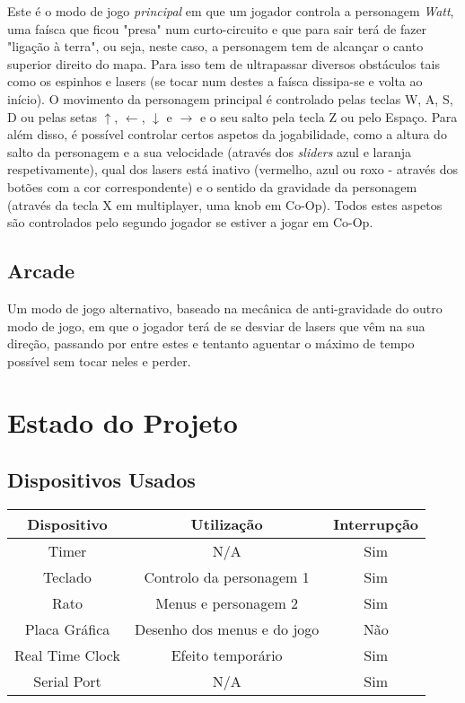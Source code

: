 \documentclass{report}
\begin{document}
Este é o modo de jogo \textit{principal} em que um jogador controla a personagem \textit{Watt}, uma faísca que ficou "presa" num curto-circuito e que para sair terá de fazer "ligação à terra", ou seja, neste caso, a personagem tem de alcançar o canto superior direito do mapa. Para isso tem de ultrapassar diversos obstáculos tais como os espinhos e lasers (se tocar num destes a faísca dissipa-se e volta ao início). \newline
O movimento da personagem principal é controlado pelas teclas W, A, S, D ou pelas setas $\uparrow$, $\leftarrow$, $\downarrow$ e $\rightarrow$ e o seu salto pela tecla Z ou pelo Espaço.
Para além disso, é possível controlar certos aspetos da jogabilidade, como a altura do salto da personagem e a sua velocidade (através dos \textit{sliders} azul e laranja respetivamente), qual dos lasers está inativo (vermelho, azul ou roxo - através dos botões com a cor correspondente) e o sentido da gravidade da personagem (através da tecla X em multiplayer, uma knob em Co-Op). Todos estes aspetos são controlados pelo segundo jogador se estiver a jogar em Co-Op.


\section{Arcade}

Um modo de jogo alternativo, baseado na mecânica de anti-gravidade do outro modo de jogo, em que o jogador terá de se desviar de lasers que vêm na sua direção, passando por entre estes e tentanto aguentar o máximo de tempo possível sem tocar neles e perder.


\chapter{Estado do Projeto}

\section{Dispositivos Usados}

\begin{center}
	\begin{tabular}{|c|c|c|} 
		\hline
			Dispositivo & Utilização & Interrupção \\ 
		\hline
		\hline
			Timer & N/A & Sim \\ 
			Teclado & Controlo da personagem 1 & Sim \\ 
			Rato & Menus e personagem 2 & Sim\\
			Placa Gráfica & Desenho dos menus e do jogo & Não\\
			Real Time Clock & Efeito temporário & Sim\\
			Serial Port & N/A & Sim \\
		\hline
	\end{tabular}
\end{center}
\end{document}
